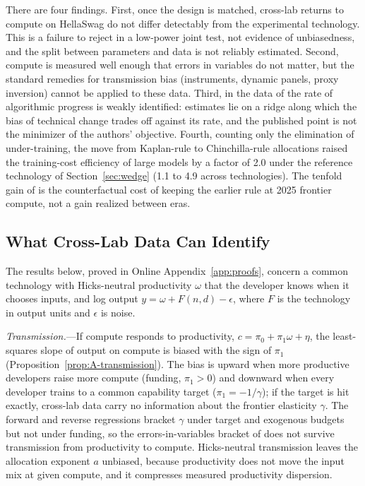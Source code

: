 There are four findings. First, once the design is matched, cross-lab returns to compute on HellaSwag do not differ
detectably from the experimental technology. This is a failure to reject in a low-power joint test, not evidence of
unbiasedness, and the split between parameters and data is not reliably estimated. Second, compute is measured well
enough that errors in variables do not matter, but the standard remedies for transmission bias (instruments, dynamic
panels, proxy inversion) cannot be applied to these data. Third, in the data of \citet{ho2024algorithmic} the rate of
algorithmic progress is weakly identified: estimates lie on a ridge along which the bias of technical change trades off
against its rate, and the published point is not the minimizer of the authors' objective. Fourth, counting only the
elimination of under-training, the move from Kaplan-rule to Chinchilla-rule allocations raised the training-cost
efficiency of large models by a factor of 2.0 under the reference technology of Section~\ref{sec:wedge} (1.1 to 4.9
across technologies). The tenfold gain of \citet{gundlach2025origin} is the counterfactual cost of keeping the earlier
rule at 2025 frontier compute, not a gain realized between eras.

\subsection{What Cross-Lab Data Can Identify}\label{app:obs-theory}

The results below, proved in Online Appendix~\ref{app:proofs}, concern a common technology with Hicks-neutral
productivity $\omega$ that the developer knows when it chooses inputs, and log output $y=\omega+F(n,d)-\epsilon$, where
$F$ is the technology in output units and $\epsilon$ is noise.

\emph{Transmission.}---If compute responds to productivity, $c=\pi_0+\pi_1\omega+\eta$, the least-squares slope of output
on compute is biased with the sign of $\pi_1$ (Proposition~\ref{prop:A-transmission}). The bias is upward when more
productive developers raise more compute (funding, $\pi_1>0$) and downward when every developer trains to a common
capability target ($\pi_1=-1/\gamma$); if the target is hit exactly, cross-lab data carry no information about the
frontier elasticity $\gamma$. The forward and reverse regressions bracket $\gamma$ under target and exogenous budgets but
not under funding, so the errors-in-variables bracket of \citet{klepper1984consistent} does not survive transmission
from productivity to compute. Hicks-neutral transmission leaves the allocation exponent $a$ unbiased, because
productivity does not move the input mix at given compute, and it compresses measured productivity dispersion.

